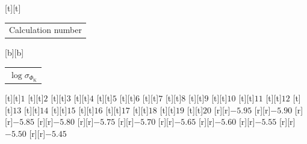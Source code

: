 %    
%
%
\begin{psfrags}%
\psfragscanon%
%
[t][t]{\color[rgb]{0,0,0}\setlength{\tabcolsep}{0pt}\begin{tabular}{c}{\Large{}Calculation number}\end{tabular}}%
[b][b]{\color[rgb]{0,0,0}\setlength{\tabcolsep}{0pt}\begin{tabular}{c}{\Large$\log \sigma_{\Phi_\mathrm{K}}$}\end{tabular}}%
%
[t][t]{$1$}%
[t][t]{$2$}%
[t][t]{$3$}%
[t][t]{$4$}%
[t][t]{$5$}%
[t][t]{$6$}%
[t][t]{$7$}%
[t][t]{$8$}%
[t][t]{$9$}%
[t][t]{$10$}%
[t][t]{$11$}%
[t][t]{$12$}%
[t][t]{$13$}%
[t][t]{$14$}%
[t][t]{$15$}%
[t][t]{$16$}%
[t][t]{$17$}%
[t][t]{$18$}%
[t][t]{$19$}%
[t][t]{$20$}%
%
[r][r]{$-5.95$}%
[r][r]{$-5.90$}%
[r][r]{$-5.85$}%
[r][r]{$-5.80$}%
[r][r]{$-5.75$}%
[r][r]{$-5.70$}%
[r][r]{$-5.65$}%
[r][r]{$-5.60$}%
[r][r]{$-5.55$}%
[r][r]{$-5.50$}%
[r][r]{$-5.45$}%
%
%
\end{psfrags}%
%
